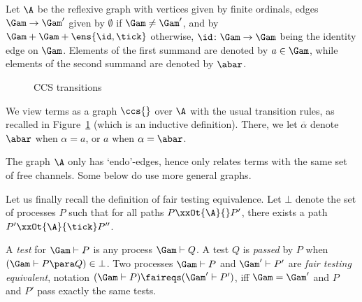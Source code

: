 \documentclass{LMCS}
\theoremstyle{plain}\newtheorem{satz}[thm]{Satz}
\begin{document}
\begin{defi}\label{def:A}
  Let $\A$ be the reflexive graph with vertices given by finite
  ordinals, edges $\Gam \to \Gam'$ given by $\emptyset$ if $\Gam \neq
  \Gam'$, and by $\Gam + \Gam + \ens{\id,\tick}$ otherwise,  $\id
  \colon \Gam \to \Gam$ being the identity edge on $\Gam$.
  Elements of the first summand are denoted by $a
  \in \Gam$, while elements of the second summand are denoted by
  $\abar$.
\end{defi}

\begin{figure}[t]
  \caption{CCS transitions}
  \label{fig:ccs}
\end{figure}
We view terms as a graph $\ccs{}$ over $\A$ with the usual transition
rules, as recalled in Figure~\ref{fig:ccs} (which is an inductive
definition).  There, we let $\overline{\alpha}$ denote $\abar$ when
$\alpha = a$, or $a$ when $\alpha = \abar$.
\begin{rem}
  The graph $\A$ only has `endo'-edges, hence only relates terms with
  the same set of free channels. Some \ltss{} below do use more
  general graphs.
\end{rem}

Let us finally recall the definition of fair testing equivalence.
Let $\bot$ denote the set of processes $P$ such that 
for all paths $P \xxOt{\A}{} P'$, there exists a path 
$P' \xxOt{\A}{\tick} P''$.
\begin{defi}\label{def:ccsfair}
  A \emph{test} for $\Gam \vdash P$ is any process $\Gam \vdash Q$.  A
  test $Q$ is \emph{passed} by $P$ when $(\Gam \vdash P \para Q) \in
  \bot$.  Two processes $\Gam \vdash P$ and $\Gam' \vdash P'$ are
  \emph{fair testing equivalent}, notation $(\Gam \vdash P) \faireqs
  (\Gam' \vdash P')$, iff $\Gam = \Gam'$ and $P$ and $P'$ pass exactly
  the same tests.
\end{defi}
\end{document}

